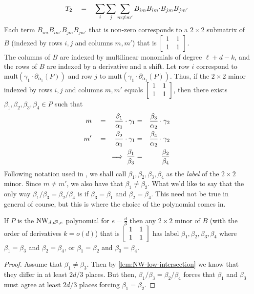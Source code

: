 \[
T_2 \quad = \quad \sum_i \sum_j \sum_{m\neq m'} B_{im}B_{im'}B_{jm}B_{jm'}
\]
Each term $B_{im}B_{im'}B_{jm}B_{jm'}$ that is non-zero corresponds to a $2\times 2$ submatrix of $B$ (indexed by rows $i,j$ and columns $m,m'$) that is $\left[\begin{array}{cc} 1 & 1\\ 1&1
  \end{array}\right]$. \\

The columns of $B$ are indexed by multilinear monomials of degree $\ell + d - k$, and the rows of $B$ are indexed by a derivative and a shift. Let row $i$ correspond to $\mathrm{mult}(\gamma_1 \cdot \partial_{\alpha_1}(P))$ and row $j$ to $\mathrm{mult}(\gamma_1 \cdot \partial_{\alpha_1}(P))$. Thus, if the $2\times 2$ minor indexed by rows $i,j$ and columns $m,m'$ equals $\left[\begin{array}{cc} 1 & 1\\ 1&1 \end{array}\right]$, then there exists $\beta_1, \beta_2,\beta_3,\beta_4 \in P$ such that
\begin{eqnarray*}
m \quad = \quad \frac{\beta_1}{\alpha_1}\cdot \gamma_1 & = & \frac{\beta_3}{\alpha_2} \cdot  \gamma_2\\
m' \quad = \quad \frac{\beta_2}{\alpha_1}\cdot \gamma_1 & = & \frac{\beta_4}{\alpha_2}\cdot \gamma_2\\
\implies \frac{\beta_1}{\beta_3} & = & \frac{\beta_2}{\beta_4}
\end{eqnarray*}
Following notation used in \cite{KLSS}, we shall call $\beta_1,\beta_2,\beta_3,\beta_4$ as the \emph{label} of the $2\times 2$ minor. 
Since $m\neq m'$, we also have that $\beta_1 \neq \beta_2$. What we'd like to say that the only way $\beta_1/\beta_3 = \beta_2/\beta_4$ is if $\beta_3 = \beta_1$ and $\beta_2 = \beta_4$. This need not be true in general of course, but this is where the choice of the polynomial comes in. 

\begin{claim}
If $P$ is the $\mathrm{NW}_{d,d^3, e}$ polynomial for $e = \frac{d}{3}$ then any $2\times 2$ minor of $B$ (with the order of derivatives $k = o(d)$) that is $\left[\begin{array}{cc} 1&1\\1&1\end{array}\right]$ has label $\beta_1,\beta_2,\beta_3,\beta_4$ where $\beta_1 = \beta_3$ and $\beta_2 = \beta_4$, or $\beta_1 = \beta_2$ and $\beta_3 = \beta_4$. 
\end{claim}
\begin{proof}
Assume that $\beta_1 \neq \beta_3$. Then by \autoref{lem:NW-low-intersection} we know that they differ in at least $2d/3$ places. But then, $\beta_1/\beta_3 = \beta_2/\beta_4$ forces that $\beta_1$ and $\beta_3$ must agree at least $2d/3$ places forcing $\beta_1 = \beta_2$. 
\end{proof}

